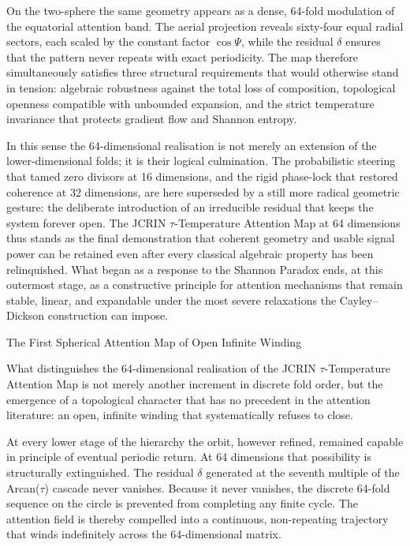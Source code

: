 On the two-sphere the same geometry appears as a dense, 64-fold modulation of the equatorial attention band. The aerial projection reveals sixty-four equal radial sectors, each scaled by the constant factor \(\cos\Psi\), while the residual \(\delta\) ensures that the pattern never repeats with exact periodicity. The map therefore simultaneously satisfies three structural requirements that would otherwise stand in tension: algebraic robustness against the total loss of composition, topological openness compatible with unbounded expansion, and the strict temperature invariance that protects gradient flow and Shannon entropy.

In this sense the 64-dimensional realisation is not merely an extension of the lower-dimensional folds; it is their logical culmination. The probabilistic steering that tamed zero divisors at 16 dimensions, and the rigid phase-lock that restored coherence at 32 dimensions, are here superseded by a still more radical geometric gesture: the deliberate introduction of an irreducible residual that keeps the system forever open. The JCRIN \(\tau\)-Temperature Attention Map at 64 dimensions thus stands as the final demonstration that coherent geometry and usable signal power can be retained even after every classical algebraic property has been relinquished. What began as a response to the Shannon Paradox ends, at this outermost stage, as a constructive principle for attention mechanisms that remain stable, linear, and expandable under the most severe relaxations the Cayley–Dickson construction can impose.

The First Spherical Attention Map of Open Infinite Winding

What distinguishes the 64-dimensional realisation of the JCRIN \(\tau\)-Temperature Attention Map is not merely another increment in discrete fold order, but the emergence of a topological character that has no precedent in the attention literature: an open, infinite winding that systematically refuses to close.

At every lower stage of the hierarchy the orbit, however refined, remained capable in principle of eventual periodic return. At 64 dimensions that possibility is structurally extinguished. The residual \(\delta\) generated at the seventh multiple of the Arcan(\(\tau\)) cascade never vanishes. Because it never vanishes, the discrete 64-fold sequence on the circle is prevented from completing any finite cycle. The attention field is thereby compelled into a continuous, non-repeating trajectory that winds indefinitely across the 64-dimensional matrix.

